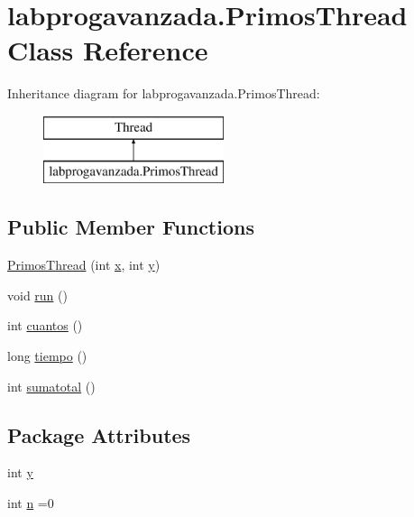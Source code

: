 \hypertarget{classlabprogavanzada_1_1_primos_thread}{}\section{labprogavanzada.\+Primos\+Thread Class Reference}
\label{classlabprogavanzada_1_1_primos_thread}
Inheritance diagram for labprogavanzada.\+Primos\+Thread\+:\begin{figure}[H]
\begin{center}
\leavevmode
\includegraphics[height=2.000000cm]{classlabprogavanzada_1_1_primos_thread}
\end{center}
\end{figure}
\subsection*{Public Member Functions}
\begin{DoxyCompactItemize}
\item 
\mbox{\hyperlink{classlabprogavanzada_1_1_primos_thread_aec27417536b36a2e8b17e87bc3ffb812}{Primos\+Thread}} (int \mbox{\hyperlink{classlabprogavanzada_1_1_primos_thread_a32c2a35f28ba168dd13573c0b2987a35}{x}}, int \mbox{\hyperlink{classlabprogavanzada_1_1_primos_thread_ab3a04e01f011379cec6e3448219ccd09}{y}})
\item 
void \mbox{\hyperlink{classlabprogavanzada_1_1_primos_thread_a53e4273857bc2a928f7cd7edfcc320de}{run}} ()
\item 
int \mbox{\hyperlink{classlabprogavanzada_1_1_primos_thread_af9a691ef3851f5fc2ee80277e56470c5}{cuantos}} ()
\item 
long \mbox{\hyperlink{classlabprogavanzada_1_1_primos_thread_aabdeaadd70a79a24bf6f622b08b041e2}{tiempo}} ()
\item 
int \mbox{\hyperlink{classlabprogavanzada_1_1_primos_thread_a9a33039e78956e9b9f6d1ec08aa5b870}{sumatotal}} ()
\end{DoxyCompactItemize}
\subsection*{Package Attributes}
\begin{DoxyCompactItemize}
\item 
int \mbox{\hyperlink{classlabprogavanzada_1_1_primos_thread_ab3a04e01f011379cec6e3448219ccd09}{y}}
\item 
int \mbox{\hyperlink{classlabprogavanzada_1_1_primos_thread_ae273c3f9736419431b182efcc4e1be3d}{n}} =0
\end{DoxyCompactItemize}
